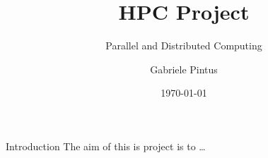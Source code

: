\documentclass[10pt]{beamer}
\title{HPC Project}
\subtitle{Parallel and Distributed Computing}
\date{\today}
\author{Gabriele Pintus}
\institute{University of Trieste}
\begin{document}
\maketitle

\begin{frame}[fragile]{Introduction}
    The aim of this is project is to \dots
\end{frame}




\end{document}
